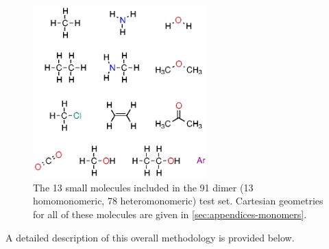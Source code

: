     \begin{figure}
      \centering
      \includegraphics[width=0.6\textwidth]{isotropic/91_dimer_test_set.eps}
      \caption{
        The 13 small molecules included in the 91 dimer (13 homomonomeric, 78
        heteromonomeric) test set. Cartesian geometries for all of these
        molecules are given in \cref{sec:appendices-monomers}.
              }
      \label{fig:isotropic-molecules}
    \end{figure}

A detailed description of this overall methodology is provided below.

